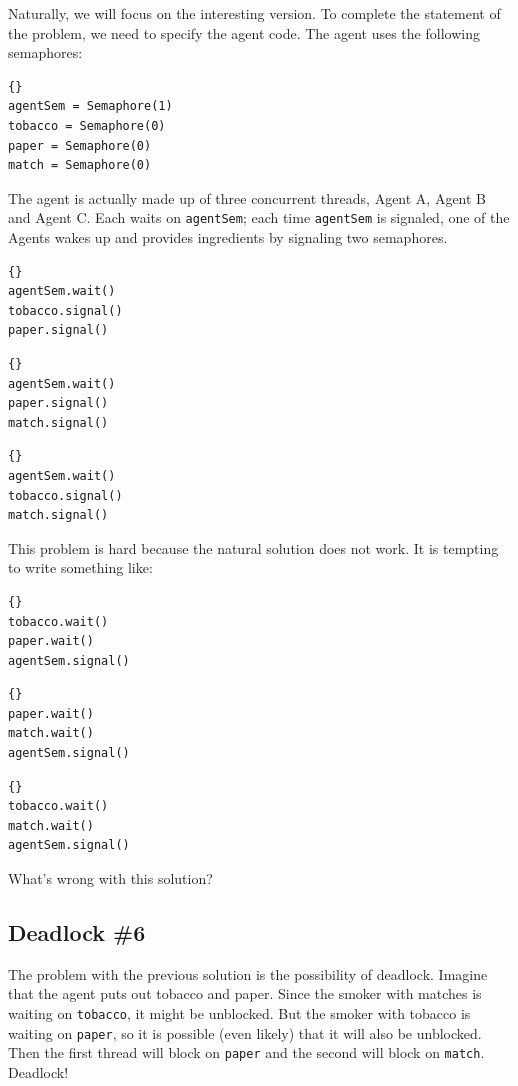 \documentclass{book}
\begin{document}
Naturally, we will focus on the interesting version.  To complete
the statement of the problem, we need to specify the agent code.
The agent uses the following semaphores:

\begin{lstlisting}[title={Agent semaphores}]{}
agentSem = Semaphore(1)
tobacco = Semaphore(0)
paper = Semaphore(0)
match = Semaphore(0)
\end{lstlisting}

The agent is actually made up of three concurrent
threads, Agent A, Agent B and Agent C.  Each waits on
    {\tt agentSem}; each time {\tt agentSem} is signaled,
one of the Agents wakes up and provides ingredients by
signaling two semaphores.

\begin{lstlisting}[title={Agent A code}]{}
agentSem.wait()
tobacco.signal()
paper.signal()
\end{lstlisting}
\begin{lstlisting}[title={Agent B code}]{}
agentSem.wait()
paper.signal()
match.signal()
\end{lstlisting}
\begin{lstlisting}[title={Agent C code}]{}
agentSem.wait()
tobacco.signal()
match.signal()
\end{lstlisting}

This problem is hard because the natural solution does not
work.  It is tempting to write something like:

\begin{lstlisting}[title={Smoker with matches}]{}
tobacco.wait()
paper.wait()
agentSem.signal()
\end{lstlisting}
\begin{lstlisting}[title={Smoker with tobacco}]{}
paper.wait()
match.wait()
agentSem.signal()
\end{lstlisting}
\begin{lstlisting}[title={Smoker with paper}]{}
tobacco.wait()
match.wait()
agentSem.signal()
\end{lstlisting}

What's wrong with this solution?


\subsection{Deadlock \#6}

The problem with the previous solution is the possibility
of deadlock.  Imagine that the agent puts out tobacco and
paper.  Since the smoker with matches is waiting on {\tt tobacco},
it might be unblocked.  But the smoker with tobacco is
waiting on {\tt paper}, so it is possible (even likely) that
it will also be unblocked.  Then the first thread will block
on {\tt paper} and the second will block on {\tt match}.
Deadlock!
\end{document}
